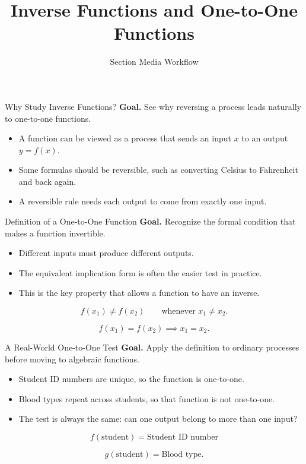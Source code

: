 \documentclass[aspectratio=169]{beamer}
\title{Inverse Functions and One-to-One Functions}
\author{Section Media Workflow}
\date{}
\begin{document}
\begin{frame}[t]{Why Study Inverse Functions?}
\textbf{Goal.} See why reversing a process leads naturally to one-to-one functions.

\begin{itemize}
  \item A function can be viewed as a process that sends an input \(x\) to an output \(y=f(x)\).
  \item Some formulas should be reversible, such as converting Celsius to Fahrenheit and back again.
  \item A reversible rule needs each output to come from exactly one input.
\end{itemize}
\end{frame}

\begin{frame}[t]{Definition of a One-to-One Function}
\textbf{Goal.} Recognize the formal condition that makes a function invertible.

\begin{itemize}
  \item Different inputs must produce different outputs.
  \item The equivalent implication form is often the easier test in practice.
  \item This is the key property that allows a function to have an inverse.
\end{itemize}

\[
f(x_1)\ne f(x_2)
\qquad \text{whenever } x_1\ne x_2.
\]

\[
f(x_1)=f(x_2) \implies x_1=x_2.
\]
\end{frame}

\begin{frame}[t]{A Real-World One-to-One Test}
\textbf{Goal.} Apply the definition to ordinary processes before moving to algebraic functions.

\begin{itemize}
  \item Student ID numbers are unique, so the function is one-to-one.
  \item Blood types repeat across students, so that function is not one-to-one.
  \item The test is always the same: can one output belong to more than one input?
\end{itemize}

\[
f(\text{student})=\text{Student ID number}
\]

\[
g(\text{student})=\text{Blood type}.
\]
\end{frame}
\end{document}
